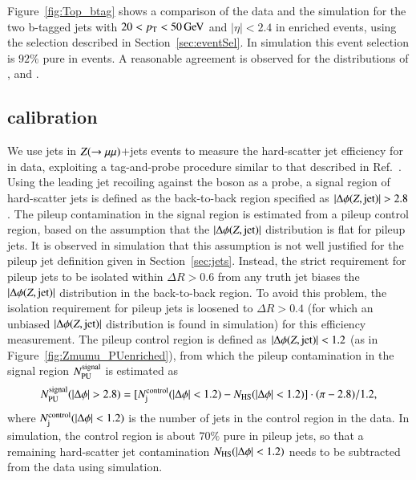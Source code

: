 \documentclass{atlasnote}
\begin{document}
Figure~\ref{fig:Top_btag} shows a comparison of the data and the simulation for the two b-tagged jets with $20<p_{\mathrm{T}}<50\,\text{Ge\hspace{-.08em}V}$ and $|\eta|<2.4$ in \ttbar enriched events, 
using the selection described 
in Section~\ref{sec:eventSel}.
In simulation this event selection is $92\%$ pure in \ttbar events. A reasonable agreement is observed for the distributions of \cJVF, \RpT and
\JVT. 

\subsection{\JVT calibration}
\label{subsec:calibration}
We use jets in $Z(\rightarrow\mu\mu)$+jets events to measure the hard-scatter jet efficiency for \JVT in data, exploiting a tag-and-probe procedure 
similar to that described in 
Ref.~\cite{CMS-PAS-JME-13-005}. Using the leading jet recoiling against the 
\Zboson boson as a probe, a signal region of hard-scatter jets is defined as the back-to-back region specified as $|\Delta \phi (Z, {\rm jet})| > 2.8$. 
The pileup contamination in the signal region is estimated from a pileup control region, 
based on the assumption that the $|\Delta \phi (Z, {\rm jet})|$ distribution is
flat for pileup jets. It is observed in simulation that this assumption is not well justified for the pileup jet definition given in Section~\ref{sec:jets}. Instead, the 
strict requirement for pileup jets to be isolated within $\Delta R>0.6$ from any truth jet biases the $|\Delta \phi (Z, {\rm jet})|$ distribution in the back-to-back region. 
To avoid this problem, the isolation requirement 
for pileup jets is loosened to $\Delta R>0.4$ (for which an unbiased $|\Delta \phi (Z, {\rm jet})|$ distribution is found in simulation) 
for this efficiency measurement. The pileup control region is defined as $|\Delta \phi (Z, {\rm jet})|<1.2$ (as in Figure~\ref{fig:Zmumu_PUenriched}), from which the pileup contamination 
in the signal region $N_{\rm PU}^{\rm signal}$ is estimated as 
\begin{eqnarray}
    {N_{{\rm PU}}^{\rm signal}(|\Delta \phi|>2.8) = [N_{\rm j}^{\rm control}(|\Delta \phi|<1.2) - N_{\rm HS}(|\Delta \phi|<1.2)] \cdot (\pi - 2.8)/1.2},
\end{eqnarray}
where $N_{\rm j}^{\rm control}(|\Delta \phi|<1.2)$ is the number of jets in the control region in the data. In simulation, the control region is about $70\%$ pure in pileup jets, so that 
a remaining hard-scatter jet contamination $N_{\rm{HS}}(|\Delta \phi|<1.2)$ needs to be subtracted from the data using simulation. 
\end{document}
